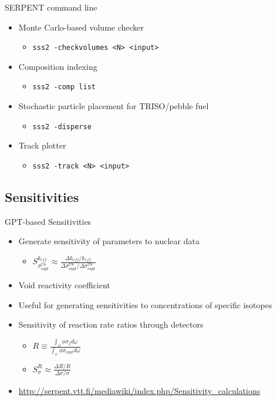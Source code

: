 \documentclass{beamer}
\begin{document}
\begin{frame}{SERPENT command line}
    \begin{itemize}
        \item Monte Carlo-based volume checker
        \begin{itemize}
            \item{\texttt{sss2 -checkvolumes <N> <input>}}
        \end{itemize}
        \item Composition indexing
        \begin{itemize}
            \item{\texttt{sss2 -comp list}}
        \end{itemize}
        \item Stochastic particle placement for TRISO/pebble fuel
        \begin{itemize}
            \item{\texttt{sss2 -disperse}}
        \end{itemize}
        \item Track plotter
        \begin{itemize}
            \item{\texttt{sss2 -track <N> <input>}}
        \end{itemize}
    \end{itemize}
\end{frame}

\subsection{Sensitivities}

\begin{frame}{GPT-based Sensitivities}
    \begin{itemize}
        \item Generate sensitivity of parameters to nuclear data
        \begin{itemize}
            \item $S^{k_{eff}}_{\sigma_{capt}^{U8}}\approx
                \frac{\Delta k_{eff}/k_{eff}}{\Delta\sigma^{U8}_{capt} / \Delta\sigma^{U8}_{capt}}$
        \end{itemize}
        \item Void reactivity coefficient
        \item Useful for generating sensitivities to concentrations of specific isotopes
        \item Sensitivity of reaction rate ratios through detectors
        \begin{itemize}
            \item $R\equiv \frac{\int_\omega\phi\sigma_fd\omega}{\int_\omega\phi\sigma_{capt}d\omega}$
            \item $S^R_\sigma\approx\frac{\Delta R/R}{\Delta\sigma /\sigma}$
        \end{itemize}
        \item \url{http://serpent.vtt.fi/mediawiki/index.php/Sensitivity\_calculations}
    \end{itemize}
\end{frame}
\end{document}

